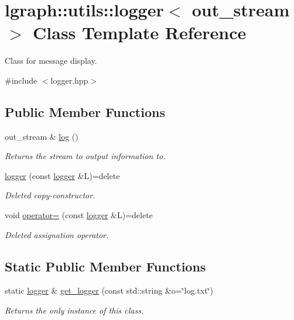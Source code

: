 \hypertarget{classlgraph_1_1utils_1_1logger}{}\section{lgraph\+:\+:utils\+:\+:logger$<$ out\+\_\+stream $>$ Class Template Reference}
\label{classlgraph_1_1utils_1_1logger}


Class for message display.  




{\ttfamily \#include $<$logger.\+hpp$>$}

\subsection*{Public Member Functions}
\begin{DoxyCompactItemize}
\item 
out\+\_\+stream \& \hyperlink{classlgraph_1_1utils_1_1logger_aa5458017ffc7b65faff47f55a056c2c5}{log} ()
\begin{DoxyCompactList}\small\item\em Returns the stream to output information to. \end{DoxyCompactList}\item 
\mbox{\label{classlgraph_1_1utils_1_1logger_ad1e8cb0e83b2d9a90cbcd57e59fcca32}} 
\hyperlink{classlgraph_1_1utils_1_1logger_ad1e8cb0e83b2d9a90cbcd57e59fcca32}{logger} (const \hyperlink{classlgraph_1_1utils_1_1logger}{logger} \&L)=delete
\begin{DoxyCompactList}\small\item\em Deleted copy-\/constructor. \end{DoxyCompactList}\item 
\mbox{\label{classlgraph_1_1utils_1_1logger_aabccbc9d1ef5c0eb431eca9f08e4af12}} 
void \hyperlink{classlgraph_1_1utils_1_1logger_aabccbc9d1ef5c0eb431eca9f08e4af12}{operator=} (const \hyperlink{classlgraph_1_1utils_1_1logger}{logger} \&L)=delete
\begin{DoxyCompactList}\small\item\em Deleted assignation operator. \end{DoxyCompactList}\end{DoxyCompactItemize}
\subsection*{Static Public Member Functions}
\begin{DoxyCompactItemize}
\item 
static \hyperlink{classlgraph_1_1utils_1_1logger}{logger} \& \hyperlink{classlgraph_1_1utils_1_1logger_af9d53836a2c37c72a08cf14f7e071abb}{get\+\_\+logger} (const std\+::string \&o=\char`\"{}log.\+txt\char`\"{})
\begin{DoxyCompactList}\small\item\em Returns the only instance of this class. \end{DoxyCompactList}\end{DoxyCompactItemize}
